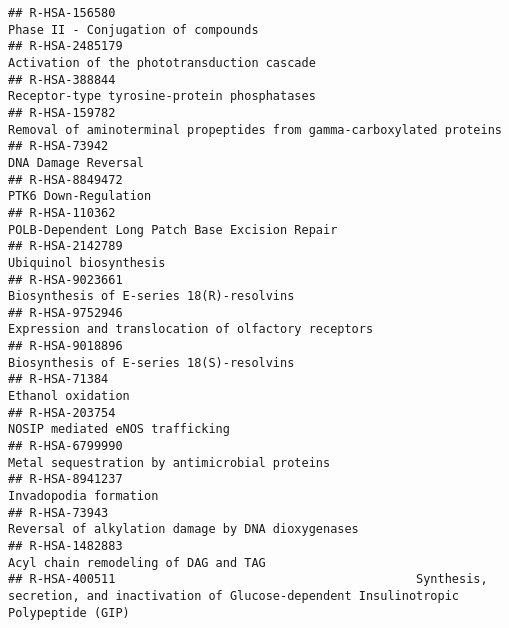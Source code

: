 \documentclass[
]{article}
\begin{document}
\begin{verbatim}
## R-HSA-156580                                                                                                   Phase II - Conjugation of compounds
## R-HSA-2485179                                                                                          Activation of the phototransduction cascade
## R-HSA-388844                                                                                           Receptor-type tyrosine-protein phosphatases
## R-HSA-159782                                                                 Removal of aminoterminal propeptides from gamma-carboxylated proteins
## R-HSA-73942                                                                                                                    DNA Damage Reversal
## R-HSA-8849472                                                                                                                 PTK6 Down-Regulation
## R-HSA-110362                                                                                        POLB-Dependent Long Patch Base Excision Repair
## R-HSA-2142789                                                                                                               Ubiquinol biosynthesis
## R-HSA-9023661                                                                                             Biosynthesis of E-series 18(R)-resolvins
## R-HSA-9752946                                                                                  Expression and translocation of olfactory receptors
## R-HSA-9018896                                                                                             Biosynthesis of E-series 18(S)-resolvins
## R-HSA-71384                                                                                                                      Ethanol oxidation
## R-HSA-203754                                                                                                       NOSIP mediated eNOS trafficking
## R-HSA-6799990                                                                                        Metal sequestration by antimicrobial proteins
## R-HSA-8941237                                                                                                                Invadopodia formation
## R-HSA-73943                                                                                      Reversal of alkylation damage by DNA dioxygenases
## R-HSA-1482883                                                                                                 Acyl chain remodeling of DAG and TAG
## R-HSA-400511                                          Synthesis, secretion, and inactivation of Glucose-dependent Insulinotropic Polypeptide (GIP)

\end{verbatim}
\end{document}
